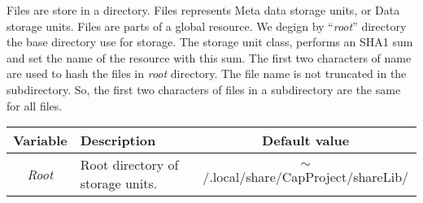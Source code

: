 Files are store in a directory.
Files represents Meta data storage units, or Data storage units.
Files are parts of a global resource.
We degign by “\emph{root}” directory the base directory use for storage.
The storage unit class, performs an SHA1 sum and set the name of the resource with this sum.
The first two characters of name are used to hash the files in \emph{root} directory.
The file name is not truncated in the subdirectory.
So, the first two characters of files in a subdirectory are the same for all files.
\\
\begin{tabular}{|c|m{4cm}|c|}
 \hline
 {Variable} & {\centering Description} & {Default value} \\
 \hline
 \emph{Root} & Root directory of storage units. & $\sim$/.local/share/CapProject/shareLib/ \\
 \hline
\end{tabular}
